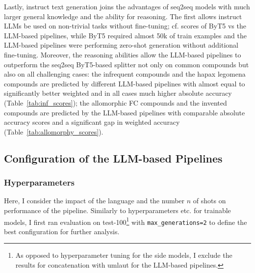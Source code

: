 \documentclass[11pt]{article}
\begin{document}
Lastly, instruct text generation joins the advantages of seq2seq models with much larger general knowledge and the ability for reasoning. The first allows instruct LLMs be used on non-trivial tasks without fine-tuning; cf. scores of ByT5 vs the LLM-based pipelines, while ByT5 required almost 50k of train examples and the LLM-based pipelines were performing zero-shot generation without additional fine-tuning. Moreover, the reasoning abilities allow the LLM-based pipelines to outperform the seq2seq ByT5-based splitter not only on common compounds but also on all challenging cases: the infrequent compounds and the hapax legomena compounds are predicted by different LLM-based pipelines with almost equal to significantly better weighted and in all cases much higher absolute accuracy (Table~\ref{tab:inf_scores}); the allomorphic FC compounds and the invented compounds are predicted by the LLM-based pipelines with comparable absolute accuracy scores and a significant gap in weighted accuracy (Table~\ref{tab:allomorphy_scores}).


\subsection{Configuration of the LLM-based Pipelines}

\subsubsection{Hyperparameters}

Here, I consider the impact of the language and the number $n$ of shots on performance of the pipeline. Similarly to hyperparameters etc. for trainable models, I first ran evaluation on test-100\footnote{As opposed to hyperparameter tuning for the side models, I exclude the results for concatenation with umlaut for the LLM-based pipelines.} with \texttt{max\_generations=2} to define the best configuration for further analysis.
\end{document}
